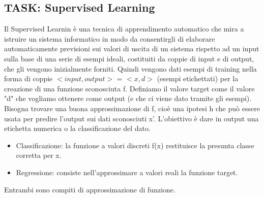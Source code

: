 \documentclass{article}
\begin{document}
\subsection{TASK: Supervised Learning}
Il Supervised Learnin è una tecnica di apprendimento automatico che mira a istruire un sistema informatico in modo da consentirgli di elaborare automaticamente previsioni sui valori di uscita di un sistema rispetto ad un input sulla base di una serie di esempi ideali, costituiti da coppie di input e di output, che gli vengono inizialmente forniti. \newline
Quindi vengono dati esempi di training nella forma di coppie $<input,output>$ = $<x,d>$ (esempi etichettati) per la creazione di una funzione sconosciuta f. Definiamo il valore target come il valore "d" che vogliamo ottenere come output (e che ci viene dato tramite gli esempi). \newline
Bisogna trovare una buona approssimazione di f, cioè una ipotesi h che può essere usata per predire l'output sui dati sconosciuti x'. \newline
L'obiettivo è dare in output una etichetta numerica o la classificazione del dato. 
\begin{itemize}
    \item Classificazione: la funzione a valori discreti f(x) restituisce la presunta classe corretta per x.
    \item Regressione: consiste nell'approssimare a valori reali la funzione target.
\end{itemize}
Entrambi sono compiti di approssimazione di funzione.
\end{document}
